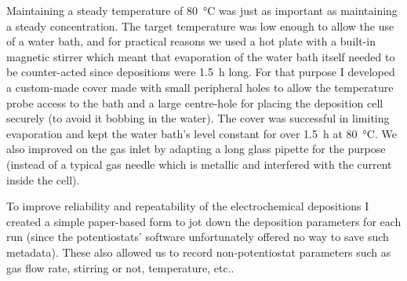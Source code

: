 \documentclass[draft,webedition,openright,titles,swedish,english]{LuaUUThesis}\usepackage[]{graphicx}\usepackage[]{xcolor}
\newcommand{\etc}{etc.}
\begin{document}
Maintaining a steady temperature of \qty{80}{\celsius} was just as important
as maintaining a steady  concentration.
The target temperature was low enough to allow the use of a water bath,
and for practical reasons we used a hot plate with a built-in magnetic stirrer
which meant that evaporation of the water bath itself needed to
be counter-acted since depositions were \qty{1.5}{\hour} long.
For that purpose I developed a custom-made cover made with small peripheral holes to allow
the temperature probe access to the bath and a large centre-hole for placing the
deposition cell securely (to avoid it bobbing in the water).
The cover was successful in limiting evaporation and kept the
water bath's level constant for over \qty{1.5}{\hour} at \qty{80}{\celsius}.
We also improved on the gas inlet by adapting a long glass pipette for the
purpose (instead of a typical gas needle which is metallic and interfered with
the current inside the cell).

To improve reliability and repeatability of the electrochemical depositions
I created a simple paper-based form to jot down the deposition parameters for each run
(since the potentiostats' software unfortunately offered no way to save such metadata).
These 
also allowed us to record non-potentiostat parameters
such as gas flow rate, stirring or not, temperature, \etc.


%
\end{document}
